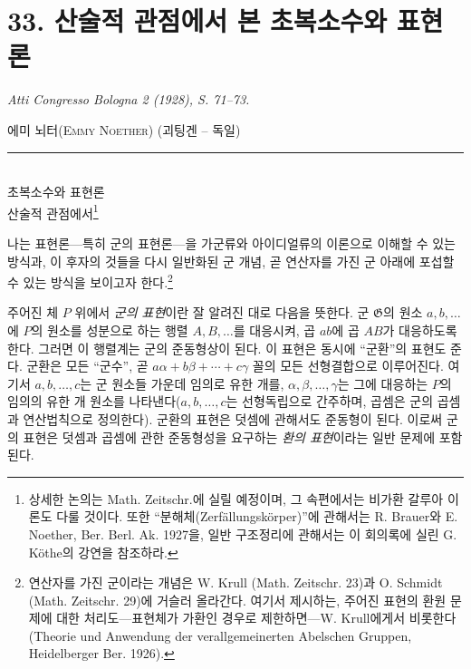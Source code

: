 
\section*{33. 산술적 관점에서 본 초복소수와 표현론}
\emph{Atti Congresso Bologna 2 (1928), S. 71--73.}

\renewcommand{\thefootnote}{(\arabic{footnote})}

\begin{center}
\textsc{에미 뇌터(Emmy Noether)} (괴팅겐 -- 독일)\\[-0.1em]
\rule{3em}{0.4pt}\\[0.8em]
\textsc{초복소수와 표현론}\\
\textsc{산술적 관점에서}\footnote{상세한 논의는 Math. Zeitschr.에 실릴 예정이며, 그 속편에서는 비가환 갈루아 이론도 다룰 것이다. 또한 ``분해체(Zerfällungskörper)''에 관해서는 R. Brauer와 E. Noether, Ber. Berl. Ak. 1927을, 일반 구조정리에 관해서는 이 회의록에 실린 G. Köthe의 강연을 참조하라.}
\end{center}

나는 표현론---특히 군의 표현론---을 가군류와 아이디얼류의 이론으로 이해할 수 있는 방식과, 이 후자의 것들을 다시 일반화된 군 개념, 곧 연산자를 가진 군 아래에 포섭할 수 있는 방식을 보이고자 한다.\footnote{연산자를 가진 군이라는 개념은 W. Krull (Math. Zeitschr. 23)과 O. Schmidt (Math. Zeitschr. 29)에 거슬러 올라간다. 여기서 제시하는, 주어진 표현의 환원 문제에 대한 처리도---표현체가 가환인 경우로 제한하면---W. Krull에게서 비롯한다(Theorie und Anwendung der verallgemeinerten Abelschen Gruppen, Heidelberger Ber. 1926).}

주어진 체 $P$ 위에서 \emph{군의 표현}이란 잘 알려진 대로 다음을 뜻한다. 군 $\mathfrak{G}$의 원소 $a,b,\ldots$에 $P$의 원소를 성분으로 하는 행렬 $A,B,\ldots$를 대응시켜, 곱 $ab$에 곱 $AB$가 대응하도록 한다. 그러면 이 행렬계는 군의 준동형상이 된다. 이 표현은 동시에 ``군환''의 표현도 준다. 군환은 모든 ``군수'', 곧 $a\alpha+b\beta+\cdots+c\gamma$ 꼴의 모든 선형결합으로 이루어진다. 여기서 $a,b,\ldots,c$는 군 원소들 가운데 임의로 유한 개를, $\alpha,\beta,\ldots,\gamma$는 그에 대응하는 $P$의 임의의 유한 개 원소를 나타낸다($a,b,\ldots,c$는 선형독립으로 간주하며, 곱셈은 군의 곱셈과 연산법칙으로 정의한다). 군환의 표현은 덧셈에 관해서도 준동형이 된다. 이로써 군의 표현은 덧셈과 곱셈에 관한 준동형성을 요구하는 \emph{환의 표현}이라는 일반 문제에 포함된다.

